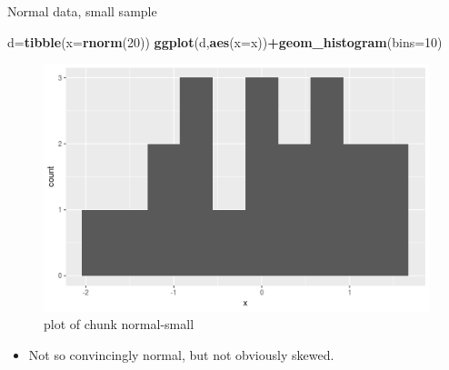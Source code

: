 \documentclass[ignorenonframetext,]{beamer}
\newenvironment{Shaded}{\begin{snugshade}}{\end{snugshade}}
\newcommand{\DataTypeTok}[1]{\textcolor[rgb]{0.13,0.29,0.53}{#1}}
\newcommand{\DecValTok}[1]{\textcolor[rgb]{0.00,0.00,0.81}{#1}}
\newcommand{\KeywordTok}[1]{\textcolor[rgb]{0.13,0.29,0.53}{\textbf{#1}}}
\newcommand{\NormalTok}[1]{#1}
\newcommand{\OperatorTok}[1]{\textcolor[rgb]{0.81,0.36,0.00}{\textbf{#1}}}
\providecommand{\tightlist}{%
  \setlength{\itemsep}{0pt}\setlength{\parskip}{0pt}}
\begin{document}
\begin{frame}[fragile]{Normal data, small sample}
\protect\hypertarget{normal-data-small-sample}{}

\begin{Shaded}
\begin{Highlighting}[]
\NormalTok{d=}\KeywordTok{tibble}\NormalTok{(}\DataTypeTok{x=}\KeywordTok{rnorm}\NormalTok{(}\DecValTok{20}\NormalTok{))}
\KeywordTok{ggplot}\NormalTok{(d,}\KeywordTok{aes}\NormalTok{(}\DataTypeTok{x=}\NormalTok{x))}\OperatorTok{+}\KeywordTok{geom_histogram}\NormalTok{(}\DataTypeTok{bins=}\DecValTok{10}\NormalTok{)}
\end{Highlighting}
\end{Shaded}

\begin{figure}
\centering
\includegraphics{figure/normal-small-1.png}
\caption{plot of chunk normal-small}
\end{figure}

\begin{itemize}
\tightlist
\item
  Not so convincingly normal, but not obviously skewed.
\end{itemize}

\end{frame}
\end{document}
